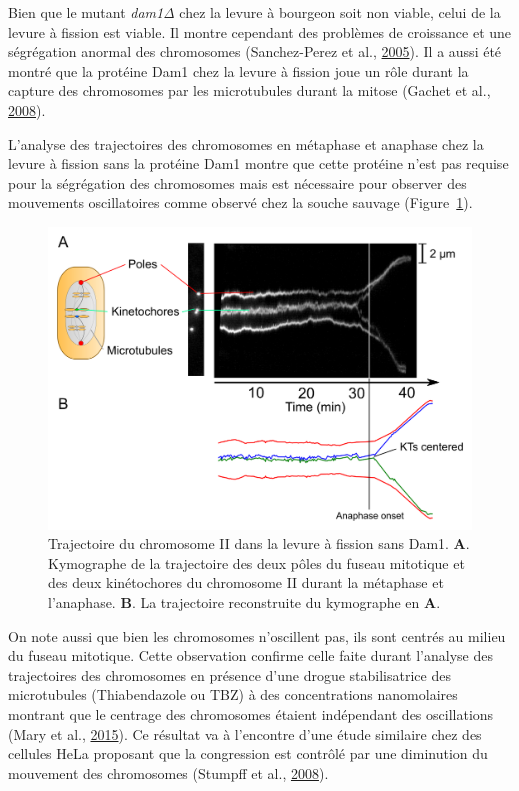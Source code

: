\documentclass[12pt,a4paper,twoside,openright]{book}
\begin{document}
Bien que le mutant \emph{dam1Δ} chez la levure à bourgeon soit non
viable, celui de la levure à fission est viable. Il montre cependant des
problèmes de croissance et une ségrégation anormal des chromosomes
(Sanchez-Perez et al., \protect\hyperlink{ref-Sanchez-Perez2005}{2005}).
Il a aussi été montré que la protéine Dam1 chez la levure à fission joue
un rôle durant la capture des chromosomes par les microtubules durant la
mitose (Gachet et al., \protect\hyperlink{ref-Gachet2008a}{2008}).

L'analyse des trajectoires des chromosomes en métaphase et anaphase chez
la levure à fission sans la protéine Dam1 montre que cette protéine
n'est pas requise pour la ségrégation des chromosomes mais est
nécessaire pour observer des mouvements oscillatoires comme observé chez
la souche sauvage (Figure~\ref{fig:dam1-traj}).

\begin{figure}[htbp]
\centering
\includegraphics{figures/annexes/dam1-traj.png}
\caption{\label{fig:dam1-traj}Trajectoire du chromosome II dans la
levure à fission sans Dam1. \textbf{A}. Kymographe de la trajectoire des
deux pôles du fuseau mitotique et des deux kinétochores du chromosome II
durant la métaphase et l'anaphase. \textbf{B}. La trajectoire
reconstruite du kymographe en \textbf{A}.}
\end{figure}

On note aussi que bien les chromosomes n'oscillent pas, ils sont centrés
au milieu du fuseau mitotique. Cette observation confirme celle faite
durant l'analyse des trajectoires des chromosomes en présence d'une
drogue stabilisatrice des microtubules (Thiabendazole ou TBZ) à des
concentrations nanomolaires montrant que le centrage des chromosomes
étaient indépendant des oscillations (Mary et al.,
\protect\hyperlink{ref-Mary2015}{2015}). Ce résultat va à l'encontre
d'une étude similaire chez des cellules HeLa proposant que la
congression est contrôlé par une diminution du mouvement des chromosomes
(Stumpff et al., \protect\hyperlink{ref-Stumpff2008}{2008}).
\end{document}
